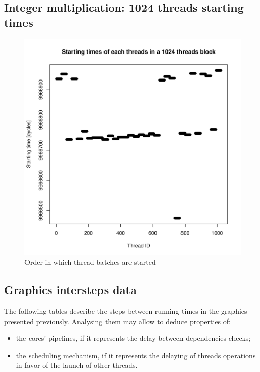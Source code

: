\documentclass{article}
\def \scalingfactor{.8}
\begin{document}
	\subsection{Integer multiplication: 1024 threads starting times}
    \begin{figure}[h]
    		\centering
		\vspace{-20pt}
	    	\includegraphics[width=\scalingfactor\linewidth]{"graphics/starting_times_ratio31"}
	    	\vspace{-15pt}
	    	\caption{Order in which thread batches are started}
    \end{figure}

    \subsection{Graphics intersteps data}
    The following tables describe the steps between running times in the graphics presented previously. Analysing them may allow to deduce properties of: 
    \begin{itemize} 
        \item the cores' pipelines, if it represents the delay between dependencies checks;
        \item the scheduling mechanism, if it represents the delaying of threads operations in favor of the launch of other threads.
    \end{itemize}
    \centering
    
    
    \pagebreak
\end{document}

